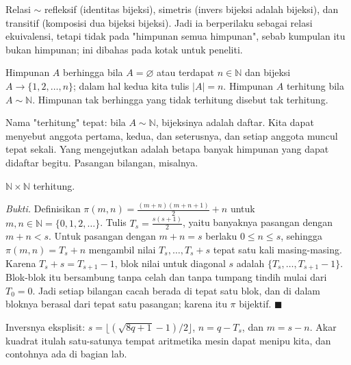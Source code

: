 Relasi $\sim$ refleksif (identitas bijeksi), simetris (invers bijeksi adalah
bijeksi), dan transitif (komposisi dua bijeksi bijeksi). Jadi ia berperilaku sebagai
relasi ekuivalensi, tetapi tidak pada "himpunan semua himpunan", sebab kumpulan itu
bukan himpunan; ini dibahas pada kotak untuk peneliti.

\begin{definisi}
Himpunan $A$ berhingga bila $A = \varnothing$ atau terdapat $n \in \mathbb{N}$ dan
bijeksi $A \to \{1,2,\dots,n\}$; dalam hal kedua kita tulis $|A| = n$. Himpunan $A$
terhitung bila $A \sim \mathbb{N}$. Himpunan tak berhingga yang tidak terhitung
disebut tak terhitung.
\end{definisi}


Nama "terhitung" tepat: bila $A \sim \mathbb{N}$, bijeksinya adalah daftar. Kita
dapat menyebut anggota pertama, kedua, dan seterusnya, dan setiap anggota muncul tepat
sekali. Yang mengejutkan adalah betapa banyak himpunan yang dapat didaftar begitu.
Pasangan bilangan, misalnya.

\begin{proposisi}
$\mathbb{N} \times \mathbb{N}$ terhitung.
\end{proposisi}
\par\smallskip\noindent\textit{Bukti.} Definisikan
$\pi(m,n) = \frac{(m+n)(m+n+1)}{2} + n$ untuk $m, n \in \mathbb{N} =
\{0,1,2,\dots\}$. Tulis $T_s = \frac{s(s+1)}{2}$, yaitu banyaknya pasangan dengan
$m + n < s$. Untuk pasangan dengan $m + n = s$ berlaku $0 \le n \le s$, sehingga
$\pi(m,n) = T_s + n$ mengambil nilai $T_s, \dots, T_s + s$ tepat satu kali
masing-masing. Karena $T_s + s = T_{s+1} - 1$, blok nilai untuk diagonal $s$ adalah
$\{T_s, \dots, T_{s+1}-1\}$. Blok-blok itu bersambung tanpa celah dan tanpa tumpang
tindih mulai dari $T_0 = 0$. Jadi setiap bilangan cacah berada di tepat satu blok,
dan di dalam bloknya berasal dari tepat satu pasangan; karena itu $\pi$ bijektif.
\hfill$\blacksquare${\parfillskip=0pt\par}

Inversnya eksplisit: $s = \lfloor (\sqrt{8q+1}-1)/2 \rfloor$, $n = q - T_s$, dan
$m = s - n$. Akar kuadrat itulah satu-satunya tempat aritmetika mesin dapat menipu
kita, dan contohnya ada di bagian lab.

